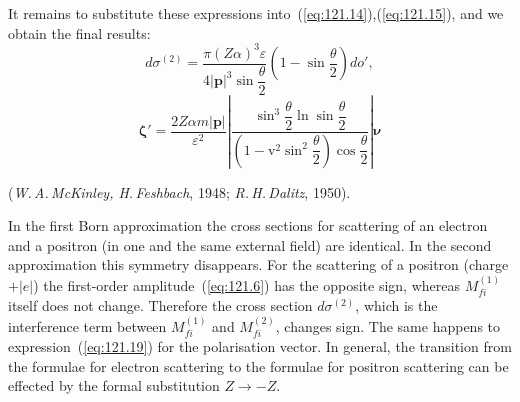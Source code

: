 It remains to substitute these expressions into~(\ref{eq:121.14}),(\ref{eq:121.15}), and we obtain the final results:
\begin{equation}
d\sigma^{(2)} = \frac{\pi(Z\alpha)^3\varepsilon}{4|\mathbf{p}|^3\sin\dfrac{\theta}{2}}\left(1 - \sin\frac{\theta}{2}\right)do',
\label{eq:121.18}
\end{equation}
\begin{equation}
\boldsymbol{\zeta}' = \frac{2Z\alpha m|\mathbf{p}|}{\varepsilon^2}\left|\frac{\sin^3\dfrac{\theta}{2}\ln\sin\dfrac{\theta}{2}}{\left(1 - \mathrm{v}^2\sin^2\dfrac{\theta}{2}\right)\cos\dfrac{\theta}{2}}\right|\boldsymbol{\nu}
\label{eq:121.19}
\end{equation}

(\textit{W.\,A.\,McKinley, H.\,Feshbach}, 1948; \textit{R.\,H.\,Dalitz}, 1950).

In the first Born approximation the cross sections for scattering of an electron and a positron (in one and the same external field) are identical. In the second approximation this symmetry disappears. For the scattering of a positron (charge $+|e|$) the first-order amplitude~(\ref{eq:121.6}) has the opposite sign, whereas $M_{fi}^{(1)}$ itself does not change. Therefore the cross section $d\sigma^{(2)}$, which is the interference term between $M_{fi}^{(1)}$ and $M_{fi}^{(2)}$, changes sign. The same happens to expression~(\ref{eq:121.19}) for the polarisation vector. In general, the transition from the formulae for electron scattering to the formulae for positron scattering can be effected by the formal substitution $Z \to -Z$.
